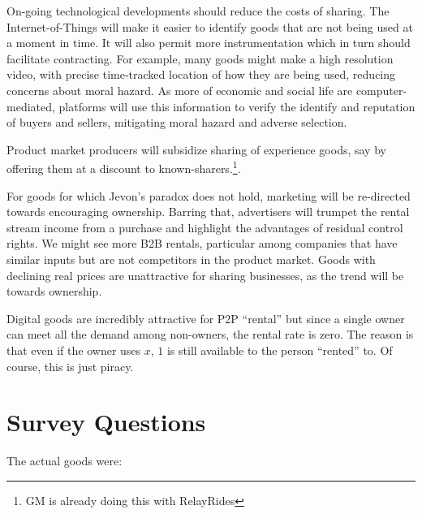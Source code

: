 \documentclass[11pt]{article}
\begin{document}
On-going technological developments should reduce the costs of sharing. 
The Internet-of-Things will make it easier to identify goods that are not being used at a moment in time. 
It will also permit more instrumentation which in turn should facilitate contracting. 
For example, many goods might make a high resolution video, with precise time-tracked location of how they are being used, reducing concerns about moral hazard. 
As more of economic and social life are computer-mediated, platforms will use this information to verify the identify and reputation of buyers and sellers, mitigating moral hazard and adverse selection.  

Product market producers will subsidize sharing of experience goods, say by offering them at a discount to known-sharers.\footnote{GM is already doing this with RelayRides}.  

For goods for which Jevon's paradox does not hold, marketing will be re-directed towards encouraging ownership.
Barring that, advertisers will trumpet the rental stream income from a purchase and highlight the advantages of residual control rights. 
We might see more B2B rentals, particular among companies that have similar inputs but are not competitors in the product market. 
Goods with declining real prices are unattractive for sharing businesses, as the trend will be towards ownership. 

Digital goods are incredibly attractive for P2P ``rental'' but since a single owner can meet all the demand among non-owners, the rental rate is zero.
The reason is that even if the owner uses $x$, $1$ is still available to the person ``rented'' to.  
Of course, this is just piracy. 


\cite{sinai2005}
\cite{ikkala2014defining}
\cite{varian2000} 
\cite{byers2013rise} 
\cite{becker1965theory} 




\newpage 

\appendix 

\section{Survey Questions} 

The actual goods were: 
\end{document}
